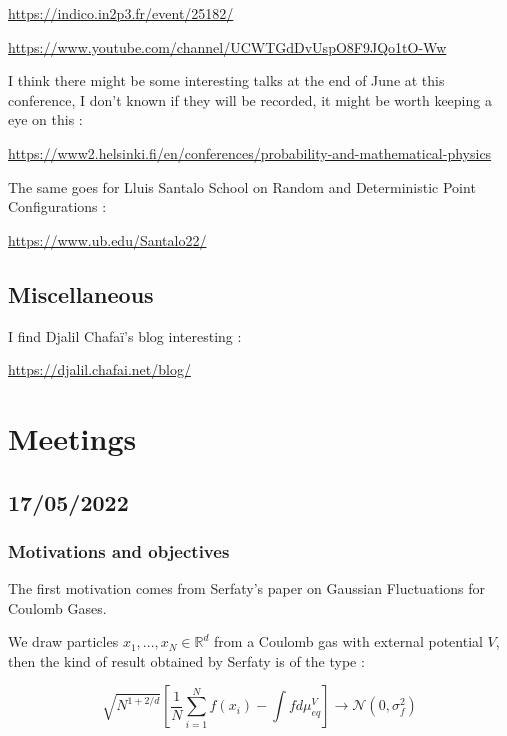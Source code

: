 \documentclass[a4paper,12pt]{report}
\begin{document}
\href{https://indico.in2p3.fr/event/25182/}{https://indico.in2p3.fr/event/25182/}

\href{https://www.youtube.com/channel/UCWTGdDvUspO8F9JQo1tO-Ww}{https://www.youtube.com/channel/UCWTGdDvUspO8F9JQo1tO-Ww}
\vspace{0.5cm}

I think there might be some interesting talks at the end of June at this conference, I don't known if they will be recorded, it might be worth keeping a eye on this :

\href{https://www2.helsinki.fi/en/conferences/probability-and-mathematical-physics}{https://www2.helsinki.fi/en/conferences/probability-and-mathematical-physics}
\vspace{0.5cm}

The same goes for Lluis Santalo School on Random and Deterministic Point Configurations :

\href{https://www.ub.edu/Santalo22/}{https://www.ub.edu/Santalo22/}

\section{Miscellaneous}

I find Djalil Chafaï's blog interesting :

\href{https://djalil.chafai.net/blog/}{https://djalil.chafai.net/blog/}


\chapter{Meetings}

\section{17/05/2022}

\subsection*{Motivations and objectives}

The first motivation comes from Serfaty's paper \cite{serfaty2020} on Gaussian Fluctuations for Coulomb Gases.

We draw particles $x_1, ..., x_N \in \mathbb{R}^{d}$ from a Coulomb gas with external potential $V$, then the kind of result obtained by Serfaty is of the type : 

\[\sqrt{N^{1+2/d} }\left[\frac{1}{N}\sum\limits_{i=1}^{N} f(x_i) - \int f d\mu_{eq}^{V}\right] \longrightarrow \mathcal{N}\left(0, \sigma_{f}^{2}\right)\]
\end{document}
